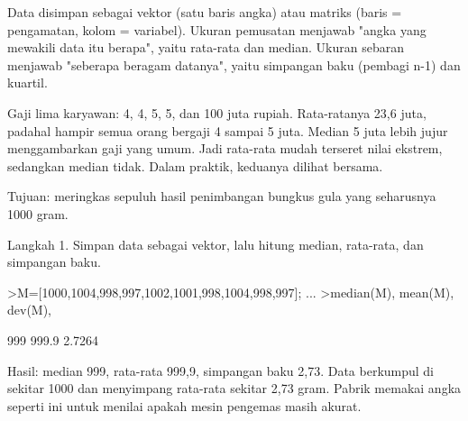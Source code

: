 \documentclass[a4paper,10pt]{article}
\begin{document}
\begin{eulernotebook}
\begin{eulercomment}
\begin{eulercomment}
\begin{eulercomment}
\begin{eulercomment}
\begin{eulercomment}
\begin{eulercomment}
\begin{eulercomment}
\end{eulercomment}
\begin{eulercomment}
Data disimpan sebagai vektor (satu baris angka) atau matriks (baris =
pengamatan, kolom = variabel). Ukuran pemusatan menjawab "angka yang
mewakili data itu berapa", yaitu rata-rata dan median. Ukuran sebaran
menjawab "seberapa beragam datanya", yaitu simpangan baku (pembagi
n-1) dan kuartil.

\end{eulercomment}
\begin{eulercomment}
Gaji lima karyawan: 4, 4, 5, 5, dan 100 juta rupiah. Rata-ratanya 23,6
juta, padahal hampir semua orang bergaji 4 sampai 5 juta. Median 5
juta lebih jujur menggambarkan gaji yang umum. Jadi rata-rata mudah
terseret nilai ekstrem, sedangkan median tidak. Dalam praktik,
keduanya dilihat bersama.

\end{eulercomment}
\begin{eulercomment}
Tujuan: meringkas sepuluh hasil penimbangan bungkus gula yang
seharusnya 1000 gram.

Langkah 1. Simpan data sebagai vektor, lalu hitung median, rata-rata,
dan simpangan baku.
\end{eulercomment}
\begin{eulerprompt}
>M=[1000,1004,998,997,1002,1001,998,1004,998,997]; ...
>median(M), mean(M), dev(M),
\end{eulerprompt}
\begin{euleroutput}
  999
  999.9
  2.7264
\end{euleroutput}
\begin{eulercomment}
Hasil: median 999, rata-rata 999,9, simpangan baku 2,73. Data berkumpul di sekitar 1000
dan menyimpang rata-rata sekitar 2,73 gram. Pabrik memakai angka seperti ini untuk
menilai apakah mesin pengemas masih akurat.


\end{eulercomment}
\end{eulercomment}
\end{eulercomment}
\end{eulercomment}
\end{eulercomment}
\end{eulercomment}
\end{eulercomment}
\end{eulernotebook}
\end{document}
